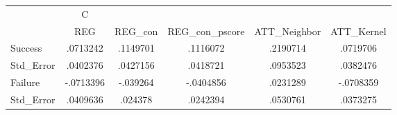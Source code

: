 \begin{tabular}{l*{5}{c}}
\hline\hline
            &           C&            &            &            &            \\
            &         REG&     REG\_con&REG\_con\_pscore&ATT\_Neighbor&  ATT\_Kernel\\
\hline
Success     &    .0713242&    .1149701&    .1116072&    .2190714&    .0719706\\
Std\_Error   &    .0402376&    .0427156&    .0418721&    .0953523&    .0382476\\
Failure     &   -.0713396&    -.039264&   -.0404856&    .0231289&   -.0708359\\
Std\_Error   &    .0409636&     .024378&    .0242394&    .0530761&    .0373275\\
\hline\hline
\end{tabular}
